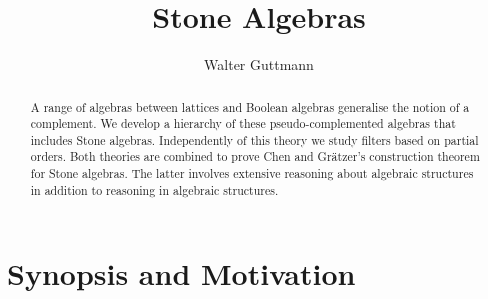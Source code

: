 \documentclass[11pt,a4paper]{article}
\begin{document}
\title{Stone Algebras}
\author{Walter Guttmann}
\maketitle

\begin{abstract}
  A range of algebras between lattices and Boolean algebras generalise the notion of a complement.
  We develop a hierarchy of these pseudo-complemented algebras that includes Stone algebras.
  Independently of this theory we study filters based on partial orders.
  Both theories are combined to prove Chen and Gr\"atzer's construction theorem for Stone algebras.
  The latter involves extensive reasoning about algebraic structures in addition to reasoning in algebraic structures.
\end{abstract}

\tableofcontents

\section{Synopsis and Motivation}
\end{document}
